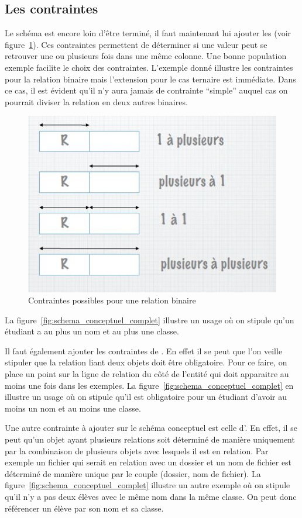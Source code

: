 \subsection{Les contraintes}
Le schéma est encore loin d'être terminé,
il faut maintenant lui ajouter les 
(voir figure~\ref{contraintes}).
Ces contraintes permettent de déterminer si une valeur peut se retrouver
une ou plusieurs fois dans une même colonne.
Une bonne population exemple facilite le choix des contraintes.
L'exemple donné illustre les contraintes pour la relation binaire mais
l'extension pour le cas ternaire est immédiate.
Dans ce cas,
il est évident qu'il n'y aura jamais de contrainte ``simple''
auquel cas on pourrait diviser la relation en deux autres binaires.
\begin{figure}[h]
  \centering
  \includegraphics[scale=0.8]{contraintes.jpg}
  \caption{Contraintes possibles pour une relation binaire}
  \label{contraintes}
\end{figure}
La figure~\ref{fig:schema_conceptuel_complet} illustre un usage où on
stipule qu'un étudiant a au plus un nom et au plus une classe.

Il faut également ajouter les contraintes de .
En effet il se peut que l'on veille stipuler que la relation
liant deux objets doit être obligatoire.
Pour ce faire, on place un point sur la ligne de relation du côté
de l'entité qui doit apparaitre au moins une fois dans les exemples.
La figure~\ref{fig:schema_conceptuel_complet} en illustre un usage où
on stipule qu'il est obligatoire pour un étudiant d'avoir
au moins un nom et au moins une classe.

Une autre contrainte à ajouter sur le schéma conceptuel est celle
d'.
En effet, il se peut qu'un objet ayant plusieurs relations soit déterminé
de manière uniquement par la combinaison de plusieurs objets avec lesquels
il est en relation.
Par exemple un fichier qui serait en relation avec un dossier et un nom de
fichier est déterminé
de manière unique par le couple (dossier, nom de fichier).
La figure~\ref{fig:schema_conceptuel_complet} illustre un autre exemple
où on stipule qu'il n'y a pas deux élèves avec
le même nom dans la même classe.
On peut donc référencer un élève par son nom et sa classe.

